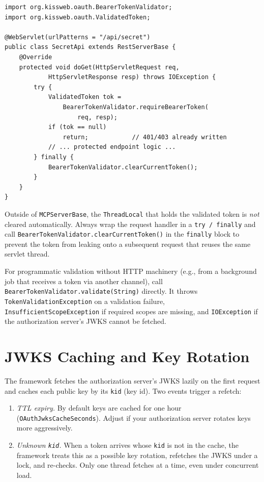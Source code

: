 \begin{lstlisting}[style=java]
import org.kissweb.oauth.BearerTokenValidator;
import org.kissweb.oauth.ValidatedToken;

@WebServlet(urlPatterns = "/api/secret")
public class SecretApi extends RestServerBase {
    @Override
    protected void doGet(HttpServletRequest req,
            HttpServletResponse resp) throws IOException {
        try {
            ValidatedToken tok =
                BearerTokenValidator.requireBearerToken(
                    req, resp);
            if (tok == null)
                return;            // 401/403 already written
            // ... protected endpoint logic ...
        } finally {
            BearerTokenValidator.clearCurrentToken();
        }
    }
}
\end{lstlisting}

\begin{warnbox}
Outside of \texttt{MCPServerBase}, the \texttt{ThreadLocal} that holds the validated token is \emph{not} cleared automatically.  Always wrap the request handler in a \texttt{try / finally} and call \texttt{BearerTokenValidator.clearCurrentToken()} in the \texttt{finally} block to prevent the token from leaking onto a subsequent request that reuses the same servlet thread.
\end{warnbox}

For programmatic validation without HTTP machinery (e.g., from a background job that receives a token via another channel), call \texttt{Bearer\-Token\-Validator.validate(String)} directly.  It throws \texttt{TokenValid\-ation\-Exception} on a validation failure, \texttt{Insufficient\-Scope\-Exception} if required scopes are missing, and \texttt{IOException} if the authorization server's JWKS cannot be fetched.

\section{JWKS Caching and Key Rotation}
\label{sec:oauth-jwks}

The framework fetches the authorization server's JWKS lazily on the first request and caches each public key by its \texttt{kid} (key id).  Two events trigger a refetch:

\begin{enumerate}
  \item \emph{TTL expiry.}  By default keys are cached for one hour (\texttt{OAuth\-Jwks\-Cache\-Seconds}).  Adjust if your authorization server rotates keys more aggressively.
  \item \emph{Unknown \texttt{kid}.}  When a token arrives whose \texttt{kid} is not in the cache, the framework treats this as a possible key rotation, refetches the JWKS under a lock, and re-checks.  Only one thread fetches at a time, even under concurrent load.
\end{enumerate}


